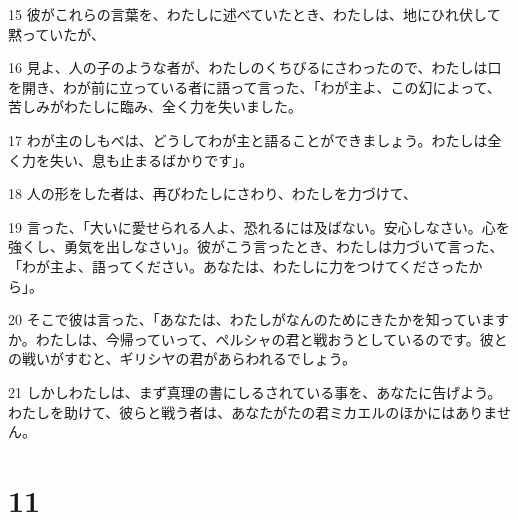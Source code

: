 \par 15 彼がこれらの言葉を、わたしに述べていたとき、わたしは、地にひれ伏して黙っていたが、
\par 16 見よ、人の子のような者が、わたしのくちびるにさわったので、わたしは口を開き、わが前に立っている者に語って言った、「わが主よ、この幻によって、苦しみがわたしに臨み、全く力を失いました。
\par 17 わが主のしもべは、どうしてわが主と語ることができましょう。わたしは全く力を失い、息も止まるばかりです」。
\par 18 人の形をした者は、再びわたしにさわり、わたしを力づけて、
\par 19 言った、「大いに愛せられる人よ、恐れるには及ばない。安心しなさい。心を強くし、勇気を出しなさい」。彼がこう言ったとき、わたしは力づいて言った、「わが主よ、語ってください。あなたは、わたしに力をつけてくださったから」。
\par 20 そこで彼は言った、「あなたは、わたしがなんのためにきたかを知っていますか。わたしは、今帰っていって、ペルシャの君と戦おうとしているのです。彼との戦いがすむと、ギリシヤの君があらわれるでしょう。
\par 21 しかしわたしは、まず真理の書にしるされている事を、あなたに告げよう。わたしを助けて、彼らと戦う者は、あなたがたの君ミカエルのほかにはありません。

\chapter{11}

